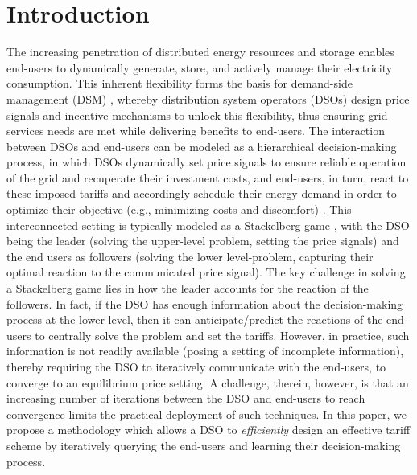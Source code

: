 \documentclass[letterpaper, 10 pt, conference]{ieeeconf}
\begin{document}
\section{Introduction}
The increasing penetration of distributed energy resources and storage enables end-users to dynamically generate, store, and actively manage their electricity consumption. This inherent flexibility forms the basis for demand-side management (DSM) \cite{albadi2008summary}, whereby distribution system operators (DSOs) design price signals and incentive mechanisms to unlock this flexibility, thus ensuring grid services needs are met while delivering benefits to end-users. The interaction between DSOs and end-users can be modeled as a hierarchical decision-making process, in which DSOs dynamically set price signals to ensure reliable operation of the grid and recuperate their investment costs, and 
end-users, in turn, react to these imposed tariffs and accordingly schedule their energy demand in order to optimize their objective (e.g., minimizing costs and discomfort) \cite{cianchi2025two}. 
This interconnected setting is typically modeled as a Stackelberg game \cite{von2010market}, with the DSO being the leader (solving the upper-level problem, setting the price signals) and the end users as followers (solving the lower level-problem, capturing their optimal reaction to the communicated price signal). The key challenge in solving a Stackelberg game lies in how the leader accounts for the reaction of the followers. In fact, if the DSO has enough information about the decision-making process at the lower level, then it can anticipate/predict the reactions of the end-users to centrally solve the problem and set the tariffs. However, in practice, such information is not readily available (posing a setting of incomplete information), thereby requiring the DSO to iteratively communicate with the end-users, to converge to an equilibrium price setting. A challenge, therein, however, is that an increasing number of iterations between the DSO and end-users to reach convergence limits the practical deployment of such techniques. In this paper, we propose a methodology which allows a DSO to \emph{efficiently} design an effective tariff scheme by iteratively querying the end-users and learning their decision-making process.
\end{document}
